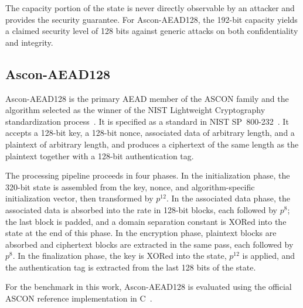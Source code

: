 The capacity portion of the state is never directly observable by an attacker
and provides the security guarantee.
For Ascon-AEAD128, the 192-bit capacity yields a claimed security level of
128 bits against generic attacks on both confidentiality and integrity.

\subsection{Ascon-AEAD128}

Ascon-AEAD128 is the primary AEAD member of the ASCON family and the algorithm
selected as the winner of the NIST Lightweight Cryptography standardization
process~\cite{ASCON2023}. It is specified as a standard in NIST
SP~800-232~\cite{NISTSP800232}.
It accepts a 128-bit key, a 128-bit nonce, associated data of arbitrary length,
and a plaintext of arbitrary length, and produces a ciphertext of the same
length as the plaintext together with a 128-bit authentication tag.

The processing pipeline proceeds in four phases.
In the initialization phase, the 320-bit state is assembled from the key, nonce,
and algorithm-specific initialization vector, then transformed by $p^{12}$.
In the associated data phase, the associated data is absorbed into the rate in
128-bit blocks, each followed by $p^8$; the last block is padded, and a domain
separation constant is XORed into the state at the end of this phase.
In the encryption phase, plaintext blocks are absorbed and ciphertext blocks are
extracted in the same pass, each followed by $p^8$.
In the finalization phase, the key is XORed into the state, $p^{12}$ is applied,
and the authentication tag is extracted from the last 128 bits of the state.

For the benchmark in this work, Ascon-AEAD128 is evaluated using the official
ASCON reference implementation in C~\cite{ASCONSoftware}.

